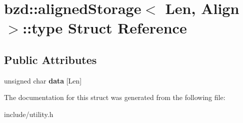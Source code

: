 \hypertarget{structbzd_1_1alignedStorage_1_1type}{}\section{bzd\+:\+:aligned\+Storage$<$ Len, Align $>$\+:\+:type Struct Reference}
\label{structbzd_1_1alignedStorage_1_1type}
\subsection*{Public Attributes}
\begin{DoxyCompactItemize}
\item 
\mbox{\label{structbzd_1_1alignedStorage_1_1type_a4ee3fe06e6300ff9311feb8f1cddb3f3}} 
unsigned char {\bfseries data} \mbox{[}Len\mbox{]}
\end{DoxyCompactItemize}


The documentation for this struct was generated from the following file\+:\begin{DoxyCompactItemize}
\item 
include/utility.\+h\end{DoxyCompactItemize}
